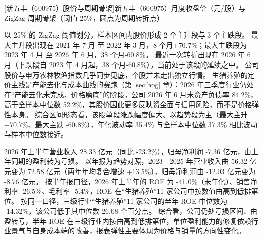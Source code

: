 \begin{center}
\begin{minipage}{\textwidth}\centering
{}

[新五丰（600975）股价与周期骨架]{新五丰（600975）月度收盘价（元/股）与 ZigZag 周期骨架（阈值 25\%，圆点为周期转折点）}
\end{minipage}
\end{center}

 以 25\% 的 ZigZag 阈值划分，样本区间内股价形成 2 个主升段与 3 个主跌段。 最大主升段出现在 2021 年 7 月 至 2022 年 3 月，8 个月+70.7\%；最大主跌段为 2023 年 4 月 至 2026 年 6 月，38 个月-60.8\%。 最近一次转折出现在 2026 年 6 月（下跌段自 2023 年 4 月起，38 个月-60.8\%），当前处于该段的延续之中。 公司股价与申万农林牧渔指数几乎同步见底，个股并未走出独立行情。 生猪养殖的定价主线是产能去化与成本曲线的赛跑（第 \ref{sec:hog} 章）：2026 年三季度行业仍处在“产能去化未完成、价格磨底”的阶段，公司 2026 年 6 月末资产负债率 84.2\%，高于全样本中位数 52.2\%，其股价因此更多反映资金面与信用风险，而不是价格弹性本身。 综合区间形态看，该股单段涨跌幅度偏大、以趋势段为主（最大主升 +70.7\%、最大主跌 -60.8\%），年化波动率 35.4\% 与全样本中位数 37.3\% 相比波动与样本中位数接近。

 2026 年上半年营业收入 28.33 亿元（同比 -23.2\%），归母净利润 -7.36 亿元，由上年同期的盈利转为亏损。 以年报为趋势对照，2023---2025 年营业收入由 56.32 亿元变为 72.58 亿元（两年年均复合增速 +13.5\%），归母净利润由 -12.03 亿元变为 -8.76 亿元。 按半年报口径，2026 年上半年的 ROE 为 -41.0\%（未年化）、销售净利率 -26.5\%、毛利率 -5.4\%，ROE 在“生猪养殖”11 家公司中按数值由高到低排第位。 按同一口径，三级行业“生猪养殖”11 家公司的半年 ROE 中位数为 -14.32\%，该公司低于其中位数 26.68 个百分点。 综合看，公司仍处亏损区间、由盈转亏，半年 ROE 在三级行业内按由高到低排第位，单位盈利能力的修复依赖行业景气与自身成本端的改善，报表弹性主要体现为价格与销量的方向性变化。


